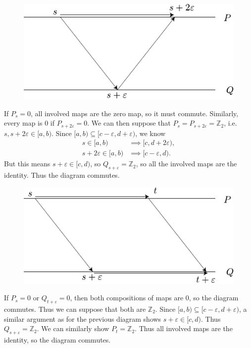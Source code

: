 \documentclass[twoside,10pt]{article}
\begin{document}
\begin{figure}[H]
	\centering
	\includegraphics[scale=1]{fig/2a.pdf}
\end{figure}

If $P_s=0$, all involved maps are the zero map, so it must commute. Similarly, every map is 0 if $P_{s+2\varepsilon}=0$. We can then suppose that $P_{s}=P_{s+2\varepsilon}=\mathbb{Z}_2$, i.e. $s,s+2\varepsilon \in [a,b)$. Since $[a,b) \subseteq [c-\varepsilon,d+\varepsilon)$, we know
\begin{align*}
	s \in [a,b) &\implies [c,d+2\varepsilon),\\
	s+2\varepsilon \in [a,b) &\implies [c-\varepsilon,d).
\end{align*}
But this means $s+\varepsilon \in [c,d)$, so $Q_{s+\varepsilon}=\mathbb{Z}_2$, so all the involved maps are the identity. Thus the diagram commutes.

\begin{figure}[H]
	\centering
	\includegraphics[scale=1]{fig/2b.pdf}
\end{figure}

If $P_s=0$ or $Q_{t+\varepsilon}=0$, then both compositions of maps are 0, so the diagram commutes. Thus we can suppose that both are $\mathbb{Z}_2$. Since $[a,b) \subseteq [c-\varepsilon,d+\varepsilon)$, a similar argument as for the previous diagram shows $s+\varepsilon \in [c,d)$. Thus $Q_{s+\varepsilon}=\mathbb{Z}_2$. We can similarly show $P_{t}=\mathbb{Z}_2$. Thus all involved maps are the identity, so the diagram commutes.
\end{document}
